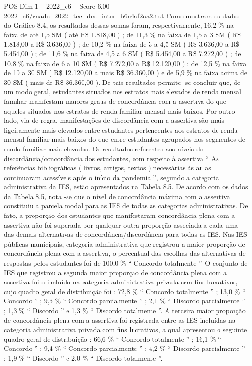 \begin{textsample}{POS Dim 1 – 2022\_c6 – Score 6.00 – 2022\_c6/enade\_2022\_tec\_des\_inter\_b6c4af2aa2.txt}
Como mostram os dados do Gráfico 8.4, os resultados dessas somas foram, respectivamente, 16,2 \% na faixa de até 1,5 SM ( até R\$ 1.818,00 ) ; de 11,3 \% na faixa de 1,5 a 3 SM ( R\$ 1.818,00 a R\$ 3.636,00 ) ; de 10,2 \% na faixa de 3 a 4,5 SM ( R\$ 3.636,00 a R\$ 5.454,00 ) ; de 11,6 \% na faixa de 4,5 a 6 SM ( R\$ 5.454,00 a R\$ 7.272,00 ) ; de 10,8 \% na faixa de 6 a 10 SM ( R\$ 7.272,00 a R\$ 12.120,00 ) ; de 12,5 \% na faixa de 10 a 30 SM ( R\$ 12.120,00 a mais R\$ 36.360,00 ) e de 5,9 \% na faixa acima de 30 SM ( mais de R\$ 36.360,00 ).
De tais resultados permite -se concluir que, de um modo geral, estudantes situados nos estratos mais elevados de renda mensal familiar manifestam maiores graus de concordância com a assertiva do que aqueles situados nos estratos de renda familiar mensal mais baixos.
Por outro lado, via de regra, manifestações de discordância com a assertiva são mais ligeiramente mais elevados entre estudantes pertencentes aos estratos de renda mensal familiar mais baixos do que entre estudantes agrupados nos segmentos de renda familiar mais elevados.
Os resultados referentes aos níveis de discordância/concordância dos estudantes, com respeito à assertiva “ As referências bibliográficas ( livros, artigos, textos ) necessárias às aulas continuaram acessíveis após o início da pandemia ”, segundo a categoria administrativa da IES, estão apresentados na Tabela 8.5.
De acordo com os dados da Tabela 8.5, nota -se que o nível de concordância máxima com a assertiva constituiu a parcela modal para as IES de todas as categorias administrativas.
De fato, a proporção dos estudantes que manifestaram concordância plena com a assertiva não foi superada por qualquer outra proporção associada a cada uma das demais alternativas de concordância/discordância para todas as IES.
Nas IES públicas municipais, categoria administrativa que registrou a maior proporção de concordância plena com a assertiva, o percentual das escolhas das alternativas de respostas pelos estudantes foi de 100,0 \% “ Concordo totalmente ”.
O conjunto de IES que registrou a segunda maior proporção de concordância plena com a assertiva foi o incluído na categoria administrativa privada sem fins lucrativos, cujo quadro geral de distribuição foi : 72,8 \% “ Concordo totalmente ” ; 13,0 \% “ Concordo ” ; 9,6 \% “ Concordo parcialmente ” ; 2,1 \% “ Discordo parcialmente ” ; 1,3 \% “ Discordo ” e 1,3 \% “ Discordo totalmente ”.
A terceira maior proporção de concordância plena com a assertiva foi registrada entre as IES incluídas na categoria administrativa privada com fins lucrativos, a qual apresentou o seguinte quadro geral de distribuição : 66,6 \% “ Concordo totalmente ” ; 16,1 \% “ Concordo ” ; 9,4 \% “ Concordo parcialmente ” ; 4,2 \% “ Discordo parcialmente ” ; 1,9 \% “ Discordo ” e 2,0 \% “ Discordo totalmente ”.

\end{textsample}
